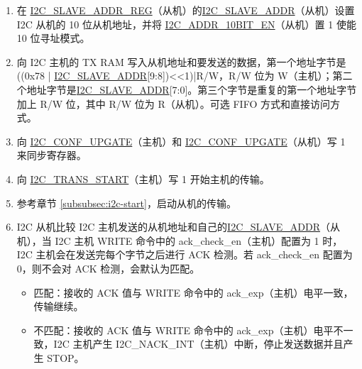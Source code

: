 \documentclass[main\_\_CN.tex]{subfiles}
\begin{document}
\begin{enumerate}
\item 在 \hyperref[regdesc:I2CSLAVEADDRREG]{I2C\_SLAVE\_ADDR\_REG}（从机）的\hyperref[fielddesc:I2CSLAVEADDR]{I2C\_SLAVE\_ADDR}（从机）设置 I2C 从机的 10 位从机地址，并将 \hyperref[fielddesc:I2CADDR10BITEN]{I2C\_ADDR\_10BIT\_EN}（从机）置 1 使能 10 位寻址模式。
\item 向 I2C 主机的 TX RAM 写入从机地址和要发送的数据，第一个地址字节是((0x78 | \hyperref[fielddesc:I2CSLAVEADDR]{I2C\_SLAVE\_ADDR}[9:8])<<1)|R/W，R/W 位为 W（主机）；第二个地址字节是\hyperref[fielddesc:I2CSLAVEADDR]{I2C\_SLAVE\_ADDR}[7:0]。第三个字节是重复的第一个地址字节加上 R/W 位，其中 R/W 位为 R（从机）。可选 FIFO 方式和直接访问方式。
\item 向 \hyperref[fielddesc:I2CCONFUPGATE]{I2C\_CONF\_UPGATE}（主机）和 \hyperref[fielddesc:I2CCONFUPGATE]{I2C\_CONF\_UPGATE}（从机）写 1 来同步寄存器。
\item 向 \hyperref[fielddesc:I2CTRANSSTART]{I2C\_TRANS\_START}（主机）写 1 开始主机的传输。
\item 参考章节 \ref{subsubsec:i2c-start}，启动从机的传输。
\item I2C 从机比较 I2C 主机发送的从机地址和自己的\hyperref[fielddesc:I2CSLAVEADDR]{I2C\_SLAVE\_ADDR}（从机），当 I2C 主机 WRITE 命令中的 ack\_check\_en（主机）配置为 1 时，I2C 主机会在发送完每个字节之后进行 ACK 检测。若 ack\_check\_en 配置为 0，则不会对 ACK 检测，会默认为匹配。

\begin{itemize}
\item 匹配：接收的 ACK 值与 WRITE 命令中的 ack\_exp（主机）电平一致，传输继续。
\item 不匹配：接收的 ACK 值与 WRITE 命令中的 ack\_exp（主机）电平不一致，I2C 主机产生 I2C\_NACK\_INT（主机）中断，停止发送数据并且产生 STOP。
\end{itemize}


\end{enumerate}
\end{document}
